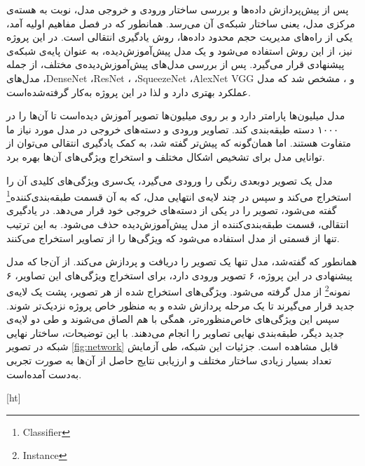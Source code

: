 
پس از پیش‌پردازش داده‌ها و بررسی ساختار ورودی و خروجی مدل، نوبت به هسته‌ی مرکزی مدل، یعنی ساختار شبکه‌ی آن می‌رسد.
همانطور که در فصل مفاهیم اولیه آمد، یکی از راه‌های مدیریت حجم محدود داده‌ها، روش یادگیری انتقالی است.
در این پروژه نیز، از این روش استفاده می‌شود و یک مدل پیش‌آموزش‌دیده، به عنوان پایه‌ی شبکه‌ی پیشنهادی قرار می‌گیرد.
پس از بررسی مدل‌های پیش‌آموزش‌دیده‌ی مختلف، از جمله مدل‌های ،DenseNet ،ResNet ، ،SqueezeNet ،AlexNet VGG و ، مشخص شد که مدل  عملکرد بهتری دارد و لذا 
در این پروژه به‌کار گرفته‌شده‌است.

مدل  میلیون‌ها پارامتر دارد و بر روی میلیون‌ها تصویر آموزش دیده‌است تا آن‌ها را در ۱۰۰۰ دسته طبقه‌بندی کند.
تصاویر ورودی و دسته‌های خروجی در مدل مورد نیاز ما متفاوت هستند. اما
همان‌گونه که پیش‌تر گفته شد، به کمک یادگیری انتقالی می‌توان از توانایی مدل  برای تشخیص اشکال مختلف و استخراج ویژگی‌های آن‌ها بهره برد.

مدل  یک تصویر دو‌بعدی رنگی را ورودی می‌گیرد، یک‌سری ویژگی‌های کلیدی آن را استخراج می‌کند و 
سپس در چند لایه‌ی انتهایی مدل، که به آن قسمت 
طبقه‌بندی‌کننده\footnote{Classifier}
گفته می‌شود، تصویر را در یکی از دسته‌های خروجی خود قرار می‌دهد.
در یادگیری انتقالی، قسمت طبقه‌بندی‌کننده از مدل پیش‌آموزش‌دیده حذف می‌شود.
به این ترتیب تنها از قسمتی از مدل استفاده می‌شود که ویژگی‌ها را از تصاویر استخراج می‌کنند.

همانطور که گفته‌شد، مدل  تنها یک تصویر را دریافت و پردازش می‌کند.
از آن‌جا که مدل پیشنهادی در این پروژه، ۶ تصویر ورودی دارد، برای استخراج ویژگی‌های این تصاویر، ۶ 
نمونه\footnote{Instance}
از مدل  گرفته می‌شود.
ویژگی‌های استخراج شده از هر تصویر، پشت یک لایه‌ی 
جدید قرار می‌گیرند تا یک مرحله پردازش شده و به منظور خاص پروژه نزدیک‌تر شوند.
سپس این ویژگی‌های خاص‌منظوره‌تر، همگی با هم الصاق می‌شوند و طی دو لایه‌ی جدید دیگر، طبقه‌بندی نهایی تصاویر را انجام می‌دهند.
با این توضیحات، ساختار نهایی شبکه در تصویر \ref{fig:network}
قابل مشاهده است.
جزئیات این شبکه، 
طی آزمایش تعداد بسیار زیادی ساختار مختلف و ارزیابی نتایج حاصل از آن‌ها به صورت تجربی به‌دست آمده‌است.


[ht]


